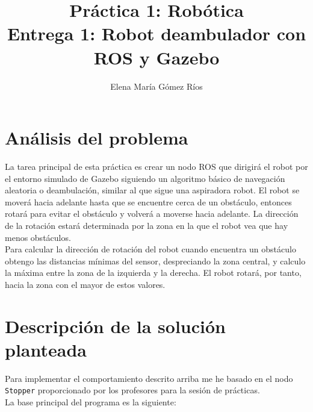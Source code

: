\documentclass[11pt]{article}
\title{Práctica	1: Robótica \\
Entrega	1: Robot deambulador con ROS y Gazebo}
\author{ Elena María Gómez Ríos }
\begin{document}
\maketitle

\section{Análisis del problema}
La tarea principal de esta práctica es crear un nodo ROS que dirigirá el robot por el entorno simulado de Gazebo siguiendo un algoritmo básico de navegación aleatoria o deambulación, similar al que sigue una aspiradora robot. El robot se moverá hacia adelante hasta que se encuentre cerca de un obstáculo, entonces rotará para evitar el obstáculo y volverá a moverse hacia adelante. La dirección de la rotación estará determinada por la zona en la que el robot vea que hay menos obstáculos.\\

Para calcular la dirección de rotación del robot cuando encuentra un obstáculo obtengo las distancias mínimas del sensor, despreciando la zona central, y calculo la máxima entre la zona de la izquierda y la derecha. El robot rotará, por tanto, hacia la zona con el mayor de estos valores.

\section{Descripción de la solución planteada}
Para implementar el comportamiento descrito arriba me he basado en el nodo \texttt{Stopper} proporcionado por los profesores para la sesión de prácticas.\\

La base principal del programa es la siguiente:
\end{document}
